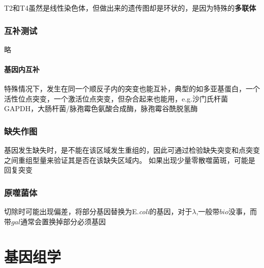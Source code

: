 \documentclass[a4paper, 12pt]{report}
\begin{document}
T2和T4虽然是线性染色体，但做出来的遗传图却是环状的，是因为特殊的\textbf{多联体}
\subsection{互补测试}
略
\subsubsection{基因内互补}
特殊情况下，发生在同一个顺反子内的突变也能互补，典型的如多亚基蛋白，一个活性位点突变，一个激活位点突变，但杂合起来也能用，e.g.沙门氏杆菌GAPDH，大肠杆菌/脉孢霉色氨酸合成酶，脉孢霉谷酰脱氢酶
\subsection{缺失作图}
基因发生缺失时，是不能在该区域发生重组的，因此可通过检验缺失突变和点突变之间重组型量来验证其是否在该缺失区域内。
如果出现少量零散噬菌斑，可能是回复突变
\subsection{原噬菌体}
切除时可能出现偏差，将部分基因替换为E.\textit{coli}的基因，对于\(\lambda\),一般带\(bio\)没事，而带\(gal\)通常会置换掉部分必须基因
\chapter{基因组学}
\end{document}
